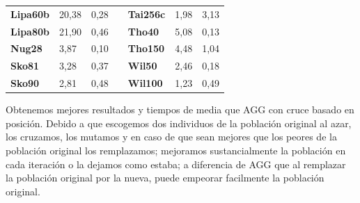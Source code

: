 \documentclass[a4paper, 12pt]{article}
\begin{document}
\begin{table}[H]
\begin{tabular}{|l|l|l|l|l|l|l|}
\textbf{Lipa60b}                    & 20,38                              & 0,28                                 &                                & \textbf{Tai256c}                   & 1,98                               & 3,13                                 \\ \cline{1-3} \cline{5-7} 
\textbf{Lipa80b}                    & 21,90                              & 0,46                                 &                                & \textbf{Tho40}                     & 5,08                               & 0,13                                 \\ \cline{1-3} \cline{5-7} 
\textbf{Nug28}                      & 3,87                               & 0,10                                 &                                & \textbf{Tho150}                    & 4,48                               & 1,04                                 \\ \cline{1-3} \cline{5-7} 
\textbf{Sko81}                      & 3,28                               & 0,37                                 &                                & \textbf{Wil50}                     & 2,46                               & 0,18                                 \\ \cline{1-3} \cline{5-7} 
\textbf{Sko90}                      & 2,81                               & 0,48                                 &                                & \textbf{Wil100}                    & 1,23                               & 0,49                                 \\ \cline{1-3} \cline{5-7} 
\end{tabular}
\end{table}

	Obtenemos mejores resultados y tiempos de media que AGG con cruce basado en posición. Debido a que escogemos dos individuos de la población original al azar, los cruzamos, los mutamos y en caso de que sean mejores que los peores de la población original los remplazamos; mejoramos sustancialmente la población en cada iteración o la dejamos como estaba; a diferencia de AGG que al remplazar la población original por la nueva, puede empeorar facilmente la población original. 
	
\end{document}
